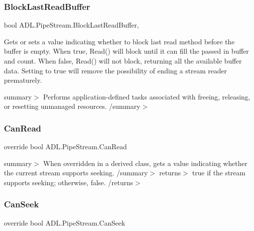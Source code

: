 \subsubsection{\texorpdfstring{Block\+Last\+Read\+Buffer}{BlockLastReadBuffer}}
{\footnotesize\ttfamily bool A\+D\+L.\+Pipe\+Stream.\+Block\+Last\+Read\+Buffer\hspace{0.3cm}{\ttfamily [get]}, {\ttfamily [set]}}



Gets or sets a value indicating whether to block last read method before the buffer is empty. When true, Read() will block until it can fill the passed in buffer and count. When false, Read() will not block, returning all the available buffer data. Setting to true will remove the possibility of ending a stream reader prematurely. 

summary$>$ Performs application-\/defined tasks associated with freeing, releasing, or resetting unmanaged resources. /summary$>$ \mbox{\label{class_a_d_l_1_1_pipe_stream_a194eae1c5b19a0999a5d12bcef00efd9}} 
\subsubsection{\texorpdfstring{Can\+Read}{CanRead}}
{\footnotesize\ttfamily override bool A\+D\+L.\+Pipe\+Stream.\+Can\+Read\hspace{0.3cm}{\ttfamily [get]}}

summary$>$ When overridden in a derived class, gets a value indicating whether the current stream supports seeking. /summary$>$ returns$>$ true if the stream supports seeking; otherwise, false. /returns$>$ \mbox{\label{class_a_d_l_1_1_pipe_stream_ad891fa332a41aeb44026c5a89ddc36e8}} 
\subsubsection{\texorpdfstring{Can\+Seek}{CanSeek}}
{\footnotesize\ttfamily override bool A\+D\+L.\+Pipe\+Stream.\+Can\+Seek\hspace{0.3cm}{\ttfamily [get]}}

